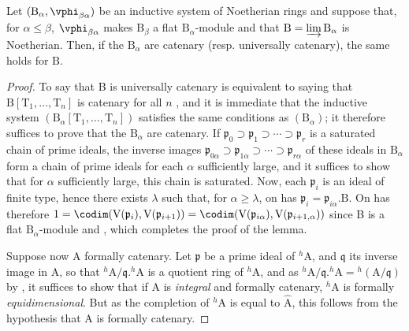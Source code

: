 \begin{lemma}[18.7.5.1]
\label{IV.18.7.5.1}
Let $(\mathrm{B}_\alpha,\vphi_{\beta\alpha})$ be an inductive system of Noetherian rings and suppose that, for $\alpha\leq\beta$, $\vphi_{\beta\alpha}$ makes $\mathrm{B}_\beta$ a flat $\mathrm{B}_\alpha$-module and that $\mathrm{B}=\varinjlim\mathrm{B}_\alpha$ is Noetherian.
Then, if the $\mathrm{B}_\alpha$ are catenary (resp. universally catenary), the same holds for $\mathrm{B}$.
\end{lemma}

\begin{proof}
To say that B is universally catenary is equivalent to saying that $\mathrm{B}[\mathrm{T}_1,\ldots,\mathrm{T}_n]$ is catenary for all $n$ , and it is immediate that the inductive system $(\mathrm{B}_\alpha[\mathrm{T}_1,\ldots,\mathrm{T}_n])$ satisfies the same conditions as $(\mathrm{B}_\alpha)$;
it therefore suffices to prove that the $\mathrm{B}_\alpha$ are catenary.
If $\mathfrak{p}_0\supset\mathfrak{p}_1\supset\cdots\supset\mathfrak{p}_r$ is a saturated chain of prime ideals, the inverse images $\mathfrak{p}_{0\alpha}\supset\mathfrak{p}_{1\alpha}\supset\cdots\supset\mathfrak{p}_{r\alpha}$ of these ideals in $\mathrm{B}_\alpha$ form a chain of prime ideals for each $\alpha$ sufficiently large, and it suffices to show that for $\alpha$ sufficiently large, this chain is saturated.
Now, each $\mathfrak{p}_i$ is an ideal of finite type, hence there exists $\lambda$ such that, for $\alpha\geq\lambda$, on has $\mathfrak{p}_i=\mathfrak{p}_{i\alpha}.\mathrm{B}$.
On has therefore $1=\codim(\mathrm{V}(\mathfrak{p}_i),\mathrm{V}(\mathfrak{p}_{i+1}))=\codim(\mathrm{V}(\mathfrak{p}_{i\alpha}),\mathrm{V}(\mathfrak{p}_{i+1,\alpha}))$ since B is a flat $\mathrm{B}_\alpha$-module  and , which completes the proof of the lemma.

Suppose now A formally catenary.
Let $\mathfrak{p}$ be a prime ideal of ${}^h\!\mathrm{A}$, and $\mathfrak{q}$ its inverse image in A, so that ${}^h\!\mathrm{A}/\mathfrak{q}.{}^h\!\mathrm{A}$ is a quotient ring of ${}^h\!\mathrm{A}$, and as ${}^h\!\mathrm{A}/\mathfrak{q}.{}^h\!\mathrm{A}={}^h(\mathrm{A}/\mathfrak{q})$ by , it suffices to show that if A is \emph{integral} and formally catenary, ${}^h\!\mathrm{A}$ is formally \emph{equidimensional}.
But as the completion of ${}^h\!\mathrm{A}$ is equal to $\hat{\mathrm{A}}$, this follows from the hypothesis that A is formally catenary.
\end{proof}

